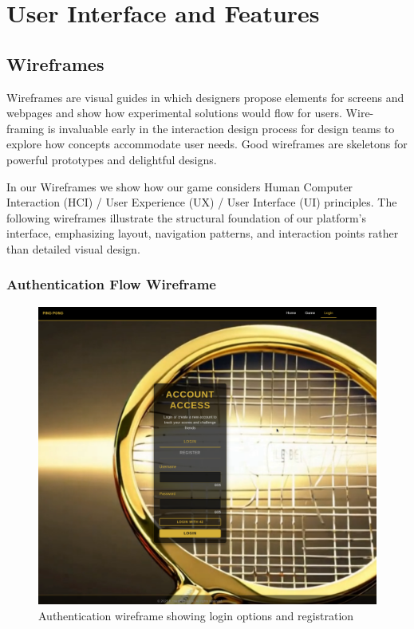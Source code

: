 \chapter{User Interface and Features}

\section{Wireframes}

Wireframes are visual guides in which designers propose elements for screens and webpages and show how experimental solutions would flow for users. Wire-framing is invaluable early in the interaction design process for design teams to explore how concepts accommodate user needs. Good wireframes are skeletons for powerful prototypes and delightful designs.

In our Wireframes we show how our game considers Human Computer Interaction (HCI) / User Experience (UX) / User Interface (UI) principles. The following wireframes illustrate the structural foundation of our platform's interface, emphasizing layout, navigation patterns, and interaction points rather than detailed visual design.

\subsection{Authentication Flow Wireframe}

\begin{figure}[H]
    \centering
    \includegraphics[width=0.7\linewidth]{Figures/images/new_images/LoginPage.png}
    \caption{Authentication wireframe showing login options and registration}
    \label{fig:wireframe-auth}
\end{figure}

